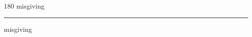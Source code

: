 
\begin{frame}
\begin{center}
\begin{turn}{180}
{\fontsize{2.5cm}{1em}\selectfont misgiving}
\end{turn}
\vspace{1em}\par  
\hrule
\vspace{1em}\par  
{\fontsize{2.5cm}{1em}\selectfont misgiving}
\end{center}
\end{frame}
